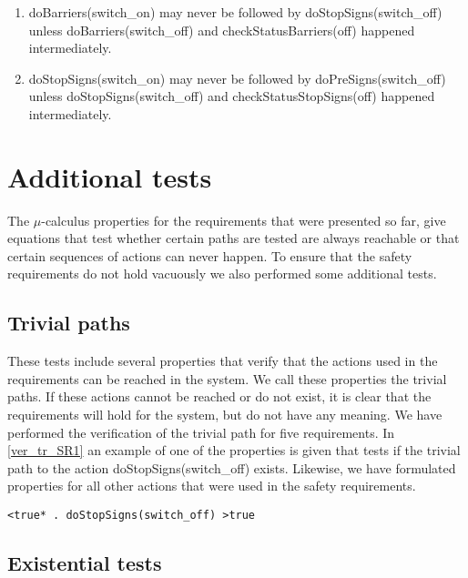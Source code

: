\begin{enumerate}
	
	\item doBarriers(switch\_on) may never be followed by doStopSigns(switch\_off) unless doBarriers(switch\_off) and checkStatusBarriers(off) happened intermediately.
	
		
	
	\item doStopSigns(switch\_on) may never be followed by doPreSigns(switch\_off) unless doStopSigns(switch\_off) and checkStatusStopSigns(off) happened intermediately. 
	
	
	
\end{enumerate}


\section{Additional tests}

	The $\mu$-calculus properties for the requirements that were presented so far, give equations that test whether certain paths are tested are always reachable or that certain sequences of actions can never happen.
	To ensure that the safety requirements do not hold vacuously we also performed some additional tests.
	
	
	\subsection{Trivial paths}
	
	These tests include several properties that verify that the actions  used in the requirements can be reached in the system.
	We call these properties the trivial paths.
	If these actions cannot be reached or do not exist, it is clear that the requirements will hold for the system, but do not have any meaning.
	We have performed the verification of the trivial path for five requirements.
	In \cref{ver_tr_SR1} an example of one of the properties is given that tests if the trivial path to the action doStopSigns(switch\_off) exists.
	Likewise, we have formulated properties for all other actions that were used in the safety requirements.
	
	\begin{lstlisting}[caption=SR1 trivial path example ,label=ver_tr_SR1] 
	<true* . doStopSigns(switch_off) >true 
	\end{lstlisting}


	\subsection{Existential tests}
	
